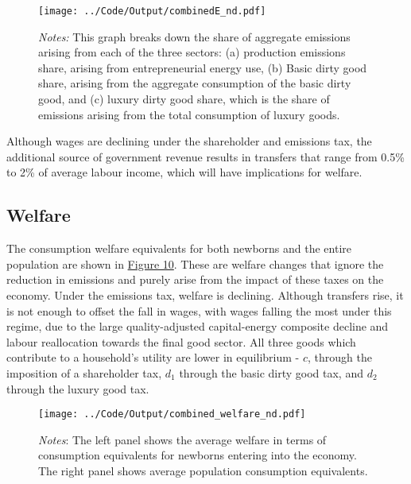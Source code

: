 \documentclass[12pt,a4paper]{article}
\begin{document}
\begin{figure}[hbtp]
    \centering

    \texttt{[image: ../Code/Output/combinedE\_nd.pdf]} 
    \captionsetup{font=footnotesize}
        \caption*{\textit{Notes:} This graph breaks down the share of aggregate emissions arising from each of the three sectors: (a) production emissions share, arising from entrepreneurial energy use, (b) Basic dirty good share, arising from the aggregate consumption of the basic dirty good, and (c) luxury dirty good share, which is the share of emissions arising from the total consumption of luxury goods.}
     \label{fig:sector}
    
\end{figure}


\hspace*{6mm} Although wages are declining under the shareholder and emissions tax, the additional source of government revenue results in transfers that range from 0.5\% to 2\% of average labour income, which will have implications for welfare.

\subsection{Welfare}
\hspace*{6mm} The consumption welfare equivalents for both newborns and the entire population are shown in \hyperref[fig:welfare]{Figure 10}. These are welfare changes that ignore the reduction in emissions and purely arise from the impact of these taxes on the economy. Under the emissions tax, welfare is declining. Although transfers rise, it is not enough to offset the fall in wages, with wages falling the most under this regime, due to the large quality-adjusted capital-energy composite decline and labour reallocation towards the final good sector. All three goods which contribute to a household's utility are lower in equilibrium - $c$, through the imposition of a shareholder tax, $d_1$ through the basic dirty good tax, and $d_2$ through the luxury good tax. 

\begin{figure}[h]
   	\centering
    \texttt{[image: ../Code/Output/combined\_welfare\_nd.pdf]} 
    \captionsetup{font=footnotesize}
    \caption*{\textit{Notes}: The left panel shows the average welfare in terms of consumption equivalents for newborns entering into the economy. The right panel shows average population consumption equivalents.}
      \label{fig:welfare}
    
\end{figure}
\end{document}
